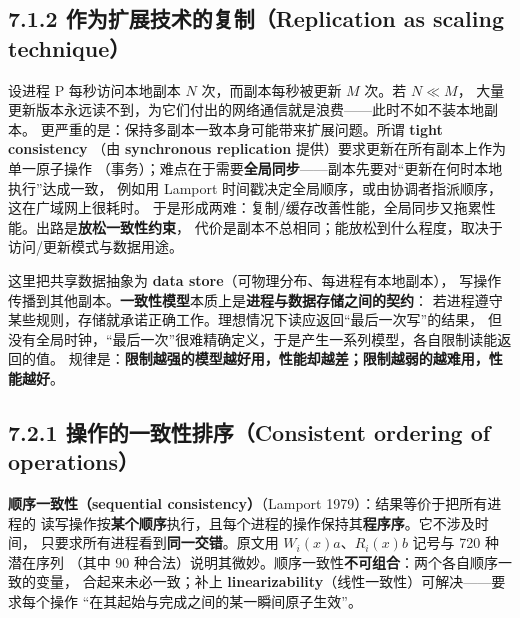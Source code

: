 
\subsection*{7.1.2 作为扩展技术的复制（Replication as scaling technique）}
设进程 P 每秒访问本地副本 $N$ 次，而副本每秒被更新 $M$ 次。若 $N \ll M$，
大量更新版本永远读不到，为它们付出的网络通信就是浪费——此时不如不装本地副本。
更严重的是：保持多副本一致本身可能带来扩展问题。所谓 \textbf{tight consistency}
（由 \textbf{synchronous replication} 提供）要求更新在所有副本上作为单一原子操作
（事务）；难点在于需要\textbf{全局同步}——副本先要对“更新在何时本地执行”达成一致，
例如用 Lamport 时间戳决定全局顺序，或由协调者指派顺序，这在广域网上很耗时。
于是形成两难：复制/缓存改善性能，全局同步又拖累性能。出路是\textbf{放松一致性约束}，
代价是副本不总相同；能放松到什么程度，取决于访问/更新模式与数据用途。

\begin{closeread}
\end{closeread}



这里把共享数据抽象为 \textbf{data store}（可物理分布、每进程有本地副本），
写操作传播到其他副本。\textbf{一致性模型}本质上是\textbf{进程与数据存储之间的契约}：
若进程遵守某些规则，存储就承诺正确工作。理想情况下读应返回“最后一次写”的结果，
但没有全局时钟，“最后一次”很难精确定义，于是产生一系列模型，各自限制读能返回的值。
规律是：\textbf{限制越强的模型越好用，性能却越差；限制越弱的越难用，性能越好}。

\subsection*{7.2.1 操作的一致性排序（Consistent ordering of operations）}
\textbf{顺序一致性（sequential consistency）}（Lamport 1979）：结果等价于把所有进程的
读写操作按\textbf{某个顺序}执行，且每个进程的操作保持其\textbf{程序序}。它不涉及时间，
只要求所有进程看到\textbf{同一交错}。原文用 $W_i(x)a$、$R_i(x)b$ 记号与 720 种潜在序列
（其中 90 种合法）说明其微妙。顺序一致性\textbf{不可组合}：两个各自顺序一致的变量，
合起来未必一致；补上 \textbf{linearizability}（线性一致性）可解决——要求每个操作
“在其起始与完成之间的某一瞬间原子生效”。

